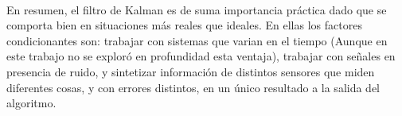	\paragraph{}
	En resumen, el filtro de Kalman es de suma importancia práctica dado que se comporta bien en situaciones más reales que ideales. En ellas los factores condicionantes son: trabajar con sistemas que varian en el tiempo (Aunque en este trabajo no se exploró en profundidad esta ventaja), trabajar con señales en presencia de ruido, y sintetizar información de distintos sensores que miden diferentes cosas, y con errores distintos, en un único resultado a la salida del algoritmo.

